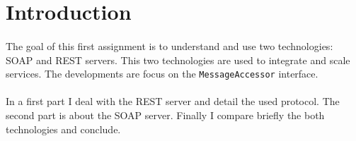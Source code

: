 \section*{Introduction}

\paragraph{}{
    The goal of this first assignment is to understand and use two technologies:
 SOAP and REST servers. This two technologies are used to integrate and scale
 services. The developments are focus on the \texttt{MessageAccessor} interface.
}

\paragraph{}{
    In a first part I deal with the REST server and detail the used protocol.
 The second part is about the SOAP server. Finally I compare briefly the both
 technologies and conclude.
}
